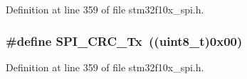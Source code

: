 Definition at line 359 of file stm32f10x\+\_\+spi.\+h.

\subsubsection[{\texorpdfstring{S\+P\+I\+\_\+\+C\+R\+C\+\_\+\+Tx}{SPI_CRC_Tx}}]{\setlength{\rightskip}{0pt plus 5cm}\#define S\+P\+I\+\_\+\+C\+R\+C\+\_\+\+Tx~(({\bf uint8\+\_\+t})0x00)}\hypertarget{group___s_p_i___c_r_c___transmit___receive_ga7b5cd97c9323e491b628fd3a7be9e133}{}\label{group___s_p_i___c_r_c___transmit___receive_ga7b5cd97c9323e491b628fd3a7be9e133}


Definition at line 359 of file stm32f10x\+\_\+spi.\+h.

